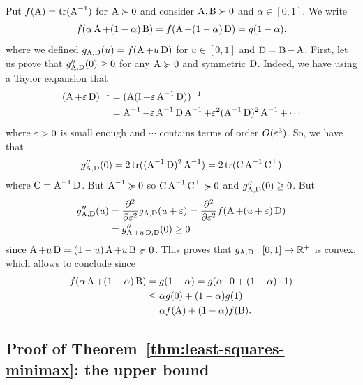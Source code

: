 Put $f(\bA) = \tr(\bA^{-1})$ for $\bA \succ 0$ and consider $\bA, \bB \succ 0$ and $\alpha \in [0, 1]$.
We write
\begin{equation*}
	f(\alpha \bA + (1 - \alpha) \bB) = f(\bA + (1 - \alpha) \bD) = g(1 - \alpha),
\end{equation*}
where we defined $g_{\bA, \bD}(u) = f(\bA + u \bD)$ for $u \in [0, 1]$ and $\bD = \bB - \bA$.
First, let us prove that $g_{\bA, \bD}''(0) \geq 0$ for any $\bA \mgeq 0$ and symmetric $\bD$.
Indeed, we have using a Taylor expansion that
\begin{align*}
	(\bA + \eps \bD)^{-1} &= (\bA (\bI + \eps \bA^{-1} \bD))^{-1} \\
	&= \bA^{-1} - \eps \bA^{-1} \bD \bA^{-1} + \eps^2 (\bA^{-1} \bD)^2 \bA^{-1} + \cdots
\end{align*}
where $\eps > 0$ is small enough and $\cdots$ contains terms of order $O(\eps^3)$.
So, we have that
\begin{align*}
	g_{\bA, \bD}''(0) = 2 \tr( (\bA^{-1} \bD)^2 \bA^{-1} ) 
	= 2 \tr( \bC \bA^{-1} \bC^\top)
\end{align*}
where $\bC = \bA^{-1} \bD$.
But $\bA^{-1} \mgeq 0$ so $\bC \bA^{-1} \bC^\top \mgeq 0$ and $g_{\bA, \bD}''(0) \geq 0$.
But
\begin{align*}
	g_{\bA, \bD}''(u) &= \frac{\partial^2}{\partial \eps^2} g_{\bA, \bD}(u + \eps) 
	= \frac{\partial^2}{\partial \eps^2} f(\bA + (u + \eps) \bD) \\
	&= g_{\bA + u \bD, \bD}''(0) \geq 0
\end{align*}
since $\bA + u \bD = (1 - u) \bA + u \bB \mgeq 0$.
This proves that $g_{\bA, \bD} : [0, 1] \rightarrow \R^+$ is convex, which allows to conclude since
\begin{align*}
	f(\alpha \bA + (1 - \alpha) \bB) &= g(1 - \alpha) 
	= g(\alpha \cdot 0 + (1 - \alpha) \cdot 1) \\
	&\leq \alpha g(0) + (1 - \alpha) g(1) \\
	&= \alpha f(\bA) + (1 - \alpha) f(\bB).
\end{align*}


\subsection{Proof of Theorem~\ref{thm:least-squares-minimax}:  the upper bound} %

